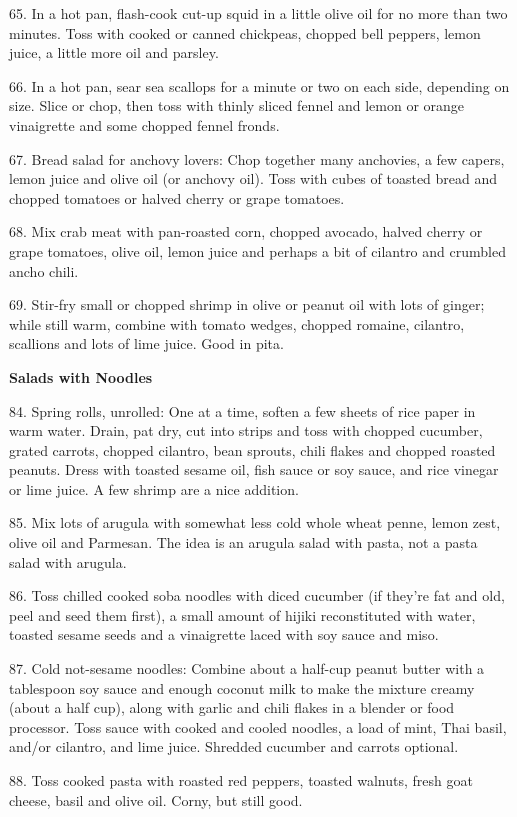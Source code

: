 \begin{recipe}
65. In a hot pan, flash-cook cut-up squid in a little olive oil for no
more than two minutes. Toss with cooked or canned chickpeas, chopped
bell peppers, lemon juice, a little more oil and parsley.

66. In a hot pan, sear sea scallops for a minute or two on each side,
depending on size. Slice or chop, then toss with thinly sliced fennel
and lemon or orange vinaigrette and some chopped fennel fronds.

67. Bread salad for anchovy lovers: Chop together many anchovies, a
few capers, lemon juice and olive oil (or anchovy oil). Toss with
cubes of toasted bread and chopped tomatoes or halved cherry or grape
tomatoes.

68. Mix crab meat with pan-roasted corn, chopped avocado, halved
cherry or grape tomatoes, olive oil, lemon juice and perhaps a bit of
cilantro and crumbled ancho chili.

69. Stir-fry small or chopped shrimp in olive or peanut oil with lots
of ginger; while still warm, combine with tomato wedges, chopped
romaine, cilantro, scallions and lots of lime juice. Good in pita.


\textbf{Salads with Noodles}

84. Spring rolls, unrolled: One at a time, soften a few sheets of rice
paper in warm water. Drain, pat dry, cut into strips and toss with
chopped cucumber, grated carrots, chopped cilantro, bean sprouts,
chili flakes and chopped roasted peanuts. Dress with toasted sesame
oil, fish sauce or soy sauce, and rice vinegar or lime juice. A few
shrimp are a nice addition.

85. Mix lots of arugula with somewhat less cold whole wheat penne,
lemon zest, olive oil and Parmesan. The idea is an arugula salad with
pasta, not a pasta salad with arugula.

86. Toss chilled cooked soba noodles with diced cucumber (if they're
fat and old, peel and seed them first), a small amount of hijiki
reconstituted with water, toasted sesame seeds and a vinaigrette laced
with soy sauce and miso.

87. Cold not-sesame noodles: Combine about a half-cup peanut butter
with a tablespoon soy sauce and enough coconut milk to make the
mixture creamy (about a half cup), along with garlic and chili flakes
in a blender or food processor. Toss sauce with cooked and cooled
noodles, a load of mint, Thai basil, and/or cilantro, and lime
juice. Shredded cucumber and carrots optional.

88. Toss cooked pasta with roasted red peppers, toasted walnuts, fresh
goat cheese, basil and olive oil. Corny, but still good.


\end{recipe}
